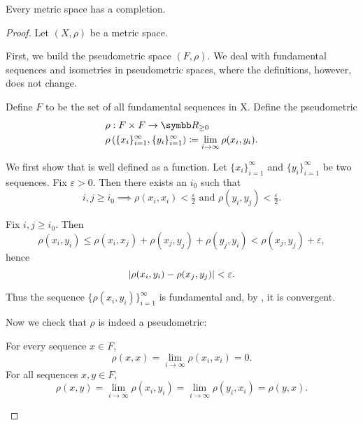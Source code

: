 \begin{theorem}\label{thm:metric_space_completion_existence}
  Every metric space has a completion.
\end{theorem}
\begin{proof}
  Let \( (X, \rho) \) be a metric space.

  \begin{defenum}
     First, we build the pseudometric space \( (F, \rho) \). We deal with fundamental sequences and isometries in pseudometric spaces, where the definitions, however, does not change.

     Define \( F \) to be the set of all fundamental sequences in X. Define the pseudometric
    \begin{align*}
      &\rho: F \times F \to \BR_{\geq 0} \\
      &\rho\left( \{ x_i \}_{i=1}^\infty, \{ y_i \}_{i=1}^\infty \right) \coloneqq \lim_{i \to \infty} \rho(x_i, y_i).
    \end{align*}

    We first show that is well defined as a function. Let \( \{ x_i \}_{i=1}^\infty \) and \( \{ y_i \}_{i=1}^\infty \) be two sequences. Fix \( \varepsilon > 0 \). Then there exists an \( i_0 \) such that
    \begin{equation*}
      i, j \geq i_0 \implies \rho(x_i, x_i) < \tfrac \varepsilon 2 \text{ and } \rho(y_i, y_j) < \tfrac \varepsilon 2.
    \end{equation*}

    Fix \( i, j \geq i_0 \). Then
    \begin{equation*}
      \rho(x_i, y_i) \leq \rho(x_i, x_j) + \rho(x_j, y_j) + \rho(y_j, y_i) < \rho(x_j, y_j) + \varepsilon,
    \end{equation*}
    hence
    \begin{equation*}
      \left\vert \rho(x_i, y_i) - \rho(x_j, y_j) \right\vert < \varepsilon.
    \end{equation*}

    Thus the sequence \( \{ \rho(x_i, y_i) \}_{i=1}^\infty \) is fundamental and, by , it is convergent.

    Now we check that \( \rho \) is indeed a pseudometric:
    \begin{description}
       For every sequence \( x \in F \),
      \begin{equation*}
        \rho(x, x) = \lim_{i \to \infty} \rho(x_i, x_i) = 0.
      \end{equation*}
       For all sequences \( x, y \in F \),
      \begin{equation*}
        \rho(x, y) = \lim_{i \to \infty} \rho(x_i, y_i) = \lim_{i \to \infty} \rho(y_i, x_i) = \rho(y, x).
      \end{equation*}


\end{description}
\end{defenum}
\end{proof}
